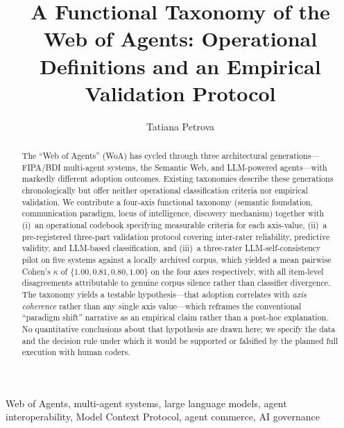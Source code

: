 \documentclass{IEEEcsmag}
\begin{document}

\title{A Functional Taxonomy of the Web of Agents: Operational Definitions and an Empirical Validation Protocol}

\author{Tatiana Petrova}


\begin{abstract}
The ``Web of Agents'' (WoA) has cycled through three architectural generations---FIPA/BDI multi-agent systems, the Semantic Web, and LLM-powered agents---with markedly different adoption outcomes.  Existing taxonomies describe these generations chronologically but offer neither operational classification criteria nor empirical validation.  We contribute a four-axis functional taxonomy (semantic foundation, communication paradigm, locus of intelligence, discovery mechanism) together with (i)~an operational codebook specifying measurable criteria for each axis-value, (ii)~a pre-registered three-part validation protocol covering inter-rater reliability, predictive validity, and LLM-based classification, and (iii)~a three-rater LLM-self-consistency pilot on five systems against a locally archived corpus, which yielded a mean pairwise Cohen's $\kappa$ of $\{1.00, 0.81, 0.80, 1.00\}$ on the four axes respectively, with all item-level disagreements attributable to genuine corpus silence rather than classifier divergence.  The taxonomy yields a testable hypothesis---that adoption correlates with \emph{axis coherence} rather than any single axis value---which reframes the conventional ``paradigm shift'' narrative as an empirical claim rather than a post-hoc explanation.  No quantitative conclusions about that hypothesis are drawn here; we specify the data and the decision rule under which it would be supported or falsified by the planned full execution with human coders.
\end{abstract}
\begin{IEEEkeywords}
Web of Agents, multi-agent systems, large language models,
agent interoperability, Model Context Protocol,
agent commerce, AI governance
\end{IEEEkeywords}

\maketitle


\end{document}
